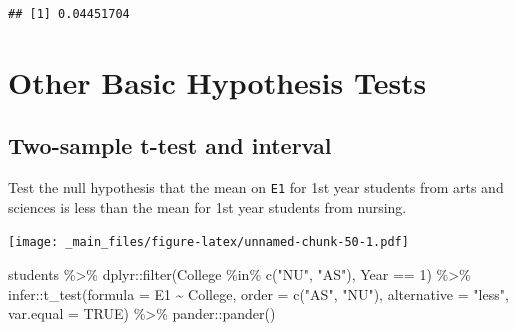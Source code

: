 \documentclass[
]{book}
\newenvironment{Shaded}{\begin{snugshade}}{\end{snugshade}}
\newcommand{\AttributeTok}[1]{\textcolor[rgb]{0.77,0.63,0.00}{#1}}
\newcommand{\ConstantTok}[1]{\textcolor[rgb]{0.00,0.00,0.00}{#1}}
\newcommand{\DecValTok}[1]{\textcolor[rgb]{0.00,0.00,0.81}{#1}}
\newcommand{\FunctionTok}[1]{\textcolor[rgb]{0.00,0.00,0.00}{#1}}
\newcommand{\NormalTok}[1]{#1}
\newcommand{\SpecialCharTok}[1]{\textcolor[rgb]{0.00,0.00,0.00}{#1}}
\newcommand{\StringTok}[1]{\textcolor[rgb]{0.31,0.60,0.02}{#1}}
\begin{document}
\begin{verbatim}
## [1] 0.04451704
\end{verbatim}

\hypertarget{other-hypothesis-tests}{%
\section{Other Basic Hypothesis Tests}\label{other-hypothesis-tests}}

\hypertarget{two-sample-t-test-and-interval}{%
\subsection{Two-sample t-test and interval}\label{two-sample-t-test-and-interval}}

Test the null hypothesis that the mean on \texttt{E1} for 1st year students from arts and sciences is less than the mean for 1st year students from nursing.

\texttt{[image: \_main\_files/figure-latex/unnamed-chunk-50-1.pdf]}

\begin{Shaded}
\begin{Highlighting}[]
\NormalTok{students }\SpecialCharTok{\%\textgreater{}\%}
\NormalTok{  dplyr}\SpecialCharTok{::}\FunctionTok{filter}\NormalTok{(College }\SpecialCharTok{\%in\%} \FunctionTok{c}\NormalTok{(}\StringTok{"NU"}\NormalTok{, }\StringTok{"AS"}\NormalTok{), Year }\SpecialCharTok{==} \DecValTok{1}\NormalTok{) }\SpecialCharTok{\%\textgreater{}\%}
\NormalTok{  infer}\SpecialCharTok{::}\FunctionTok{t\_test}\NormalTok{(}\AttributeTok{formula =}\NormalTok{ E1 }\SpecialCharTok{\textasciitilde{}}\NormalTok{ College, }
       \AttributeTok{order =} \FunctionTok{c}\NormalTok{(}\StringTok{"AS"}\NormalTok{, }\StringTok{"NU"}\NormalTok{),}
       \AttributeTok{alternative =} \StringTok{"less"}\NormalTok{, }
       \AttributeTok{var.equal =} \ConstantTok{TRUE}\NormalTok{) }\SpecialCharTok{\%\textgreater{}\%} 
\NormalTok{  pander}\SpecialCharTok{::}\FunctionTok{pander}\NormalTok{()}
\end{Highlighting}
\end{Shaded}
\end{document}
